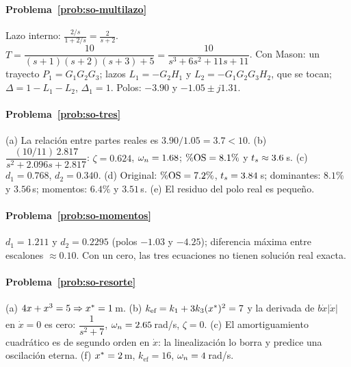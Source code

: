 \paragraph{Problema~\ref{prob:so-multilazo}}
Lazo interno: $\frac{2/s}{1+2/s}=\frac{2}{s+2}$. $T=\dfrac{10}{(s+1)(s+2)(s+3)+5}=\dfrac{10}{s^3+6s^2+11s+11}$. Con Mason: un trayecto $P_1=G_1G_2G_3$; lazos $L_1=-G_2H_1$ y $L_2=-G_1G_2G_3H_2$, que se tocan; $\Delta=1-L_1-L_2$, $\Delta_1=1$. Polos: $-3.90$ y $-1.05\pm j1.31$.

\paragraph{Problema~\ref{prob:so-tres}}
(a) La relación entre partes reales es $3.90/1.05=3.7<10$. (b) $\dfrac{(10/11)\,2.817}{s^2+2.096s+2.817}$: $\zeta=0.624$, $\omega_n=1.68$; $\%\mathrm{OS}=8.1\%$ y $t_s\approx3.6$\,s. (c) $d_1=0.768$, $d_2=0.340$. (d) Original: $\%\mathrm{OS}=7.2\%$, $t_s=3.84$\,s; dominantes: $8.1\%$ y $3.56$\,s; momentos: $6.4\%$ y $3.51$\,s. (e) El residuo del polo real es pequeño.

\paragraph{Problema~\ref{prob:so-momentos}}
$d_1=1.211$ y $d_2=0.2295$ (polos $-1.03$ y $-4.25$); diferencia máxima entre escalones $\approx0.10$. Con un cero, las tres ecuaciones no tienen solución real exacta.

\paragraph{Problema~\ref{prob:so-resorte}}
(a) $4x+x^3=5\Rightarrow x^{*}=1$\,m. (b) $k_{\text{ef}}=k_1+3k_3(x^{*})^2=7$ y la derivada de $b\dot x|\dot x|$ en $\dot x=0$ es cero: $\dfrac{1}{s^2+7}$, $\omega_n=2.65$\,rad/s, $\zeta=0$. (c) El amortiguamiento cuadrático es de segundo orden en $\dot x$: la linealización lo borra y predice una oscilación eterna. (f) $x^{*}=2$\,m, $k_{\text{ef}}=16$, $\omega_n=4$\,rad/s.

\respuestaspausas
